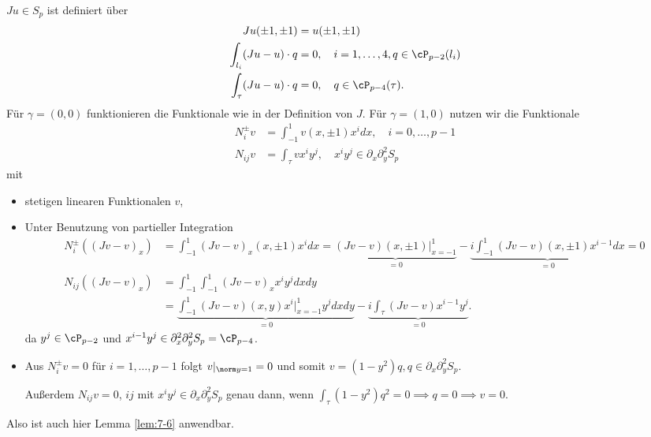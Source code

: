$Ju \in S_{p}$ ist definiert über
\begin{align*}
  Ju (\pm 1, \pm 1) &= u(\pm 1, \pm 1)\\
\int_{l_{i}} (Ju- u)\cdot q &= 0, \quad i =1, \dots, 4, q \in \cP_{p-2}(l_{i})\\
\int_{\tau}(Ju - u)\cdot q &= 0, \quad q \in \cP_{p-4}(\tau). 
\end{align*}
Für $\gamma = (0, 0)$ funktionieren die Funktionale wie in der Definition von $J$. Für $\gamma = (1, 0)$ nutzen wir die Funktionale 
\begin{align*}
  N_{i}^{\pm} v &= \int_{-1}^{1} v(x, \pm 1)x^{i} dx , \quad i = 0, \dots, p-1\\
  N_{ij} v &= \int_{\tau} vx^{i}y^{j}, \quad x^{i}y^{j} \in \partial_{x} \partial^{2}_{y} S_{p} 
\end{align*}
mit
\begin{itemize}
\item stetigen linearen Funktionalen $v$, 
\item Unter Benutzung von partieller Integration
  \begin{align*}
      N_{i}^{\pm} ((Jv-v)_{x}) &= \int_{-1}^{1} (Jv - v)_{x} (x, \pm 1)x^{i} dx = \underbrace{(Jv- v)(x, \pm 1)|_{x = -1}^{1}}_{=0} - \underbrace{i \int_{-1}^{1} (Jv - v)(x, \pm1)x^{i-1} dx}_{=0} = 0\\
  N_{ij} ((Jv-v)_{x}) &= \int_{-1}^{1}\int_{-1}^{1}(Jv - v)_{x}x^{i}y^{j} dxdy \\
&=\underbrace{\int_{-1}^{1} (Jv - v)(x, y)x^{i}|_{x = -1}^{1} y^{j} dxdy}_{=0} - \underbrace {i \int_{\tau} (Jv - v)x^{i-1}y^{j}}_{=0}. 
  \end{align*}
da $y^{j}\in \cP_{p-2}$ und $x^{i-1}y^{j} \in \partial_{x}^{2} \partial_{y}^{2} S_{p} = \cP_{p-4}$.  
\item Aus $N_{i}^{\pm}v = 0$ für $i = 1, \dots, p-1$ folgt $v|_{\norm y = 1} = 0$ und somit $v = (1 - y^{2})q, q \in \partial_{x} \partial_{y}^{2} S_{p}$. 

Außerdem $N_{ij}v = 0$, $ij$ mit $x^{i}y^{j} \in\partial_{x} \partial_{y}^{2} S_{p}$ genau dann, wenn $\int_{\tau} (1 - y^{2})q^{2} = 0 \implies q = 0 \implies v = 0. $
\end{itemize}
Also ist auch hier Lemma \ref{lem:7-6} anwendbar.



